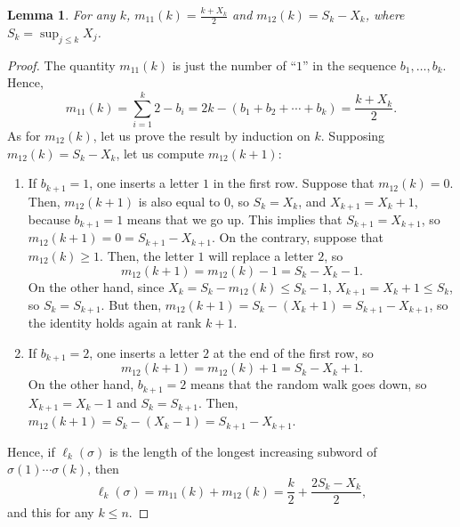 \documentclass[smallextended,nospthms]{svjour3}
\newtheorem{lemma}[theorem]{Lemma}
\theoremstyle{remark}
\begin{document}
\begin{lemma}\label{2shuffle}
For any $k$, $m_{11}(k)=\frac{k+X_{k}}{2}$ and $m_{12}(k)=S_{k}-X_{k}$, where $S_{k}=\sup_{j \leq k}X_{j}$.
\end{lemma}
\begin{proof}
The quantity $m_{11}(k)$ is just the number of ``$1$'' in the sequence $b_{1},\ldots,b_{k}$. Hence, 
$$m_{11}(k)=\sum_{i=1}^{k} 2-b_{i}=2k-(b_{1}+b_{2}+\cdots+b_{k})=\frac{k+X_{k}}{2}.$$
As for $m_{12}(k)$, let us prove the result by induction on $k$. Supposing $m_{12}(k)=S_{k}-X_{k}$, let us compute $m_{12}(k+1)$:\vspace{2mm}
\begin{enumerate}
\item If $b_{k+1}=1$, one inserts a letter $1$ in the first row. Suppose that $m_{12}(k)=0$. Then, $m_{12}(k+1)$ is also equal to $0$, so $S_{k}=X_{k}$, and $X_{k+1}=X_{k}+1$, because $b_{k+1}=1$ means that we go up. This implies that $S_{k+1}=X_{k+1}$, so $m_{12}(k+1)=0=S_{k+1}-X_{k+1}.$ On the contrary, suppose that $m_{12}(k)\geq 1$. Then, the letter $1$ will replace a letter $2$, so 
$$m_{12}(k+1)=m_{12}(k)-1=S_{k}-X_{k}-1.$$ On the other hand, since $X_{k}=S_{k}-m_{12}(k) \leq S_{k}-1$, $X_{k+1}=X_{k}+1 \leq S_{k}$, so $S_{k}=S_{k+1}$. But then, $m_{12}(k+1)=S_{k}-(X_{k}+1)=S_{k+1}-X_{k+1}$, so the identity holds again at rank $k+1$.\vspace{2mm}
\item If $b_{k+1}=2$, one inserts a letter $2$ at the end of the first row, so $$m_{12}(k+1)=m_{12}(k)+1=S_{k}-X_{k}+1.$$ On the other hand, $b_{k+1}=2$ means that the random walk goes down, so $X_{k+1}=X_{k}-1$ and $S_{k}=S_{k+1}$. Then, $m_{12}(k+1)=S_{k}-(X_{k}-1)=S_{k+1}-X_{k+1}$.
 \end{enumerate}
Hence, if $\ell_{k}(\sigma)$ is the length of the longest increasing subword of $\sigma(1)\cdots \sigma(k)$, then 
$$\ell_{k}(\sigma)=m_{11}(k)+m_{12}(k)=\frac{k}{2}+ \frac{2S_{k}-X_{k}}{2} ,$$
and this for any $k\leq n$.
\end{proof}
\bigskip\bigskip
\end{document}
